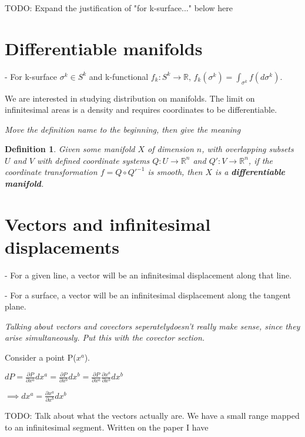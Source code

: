 \documentclass{book}
\newtheorem{defn}[equation]{Definition}
\begin{document}
TODO: Expand the justification of "for k-surface..." below here

\section{Differentiable manifolds}


- For k-surface $\sigma^k \in S^k$ and k-functional $f_k: S^k \to \mathbb{R}$, $f_k(\sigma^k) = \int_{\sigma^k}f(d\sigma^k)$. 

We are interested in studying distribution on manifolds. The limit on infinitesimal areas is a density and requires coordinates to be differentiable.



\emph{Move the definition name to the beginning, then give the meaning}
\begin{defn}
	Given some manifold $X$ of dimension $n$, with overlapping subsets $U$ and $V$ with defined coordinate systems $Q: U \to \mathbb{R}^n$ and $Q': V \to \mathbb{R}^n$, if the coordinate transformation $f = Q \circ Q'^{-1}$ is smooth, then $X$ is a \textbf{differentiable manifold}. 
\end{defn}





\section{Vectors and infinitesimal displacements}

- For a given line, a vector will be an infinitesimal displacement along that line. 

- For a surface, a vector will be an infinitesimal displacement along the tangent plane. 

\emph{Talking about vectors and covectors seperatelydoesn't really make sense, since they arise simultaneously. Put this with the covector section.}

Consider a point P($x^a$).
 
$dP = \frac{\partial P}{\partial x^a} dx^a = \frac{\partial P}{\partial x^b} dx^b = \frac{\partial P}{\partial x^a}\frac{\partial x^a}{\partial x^b} dx^b$

$\implies dx^a = \frac{\partial x^a}{\partial x^b}dx^b $

TODO: Talk about what the vectors actually are. We have a small range mapped to an infinitesimal segment. Written on the paper I have
\end{document}
